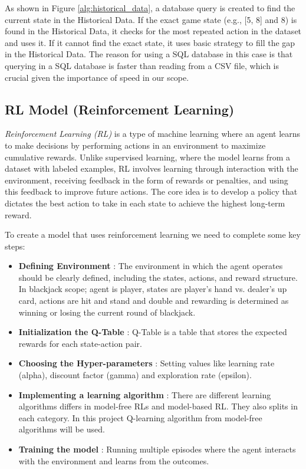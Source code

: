 \documentclass[a4paper,12pt]{report}
\begin{document}
As shown in Figure \ref{alg:historical_data}, a database query is created to find the current state in the Historical Data. If the exact game state (e.g., [5, 8] and 8) is found in the Historical Data, it checks for the most repeated action in the dataset and uses it. If it cannot find the exact state, it uses basic strategy to fill the gap in the Historical Data. The reason for using a SQL database in this case is that querying in a SQL database is faster than reading from a CSV file, which is crucial given the importance of speed in our scope.

\subsection{RL Model (Reinforcement Learning)}
\label{RL}
\textit{Reinforcement Learning (RL)} is a type of machine learning where an agent learns to make decisions by performing actions in an environment to maximize cumulative rewards. Unlike supervised learning, where the model learns from a dataset with labeled examples, RL involves learning through interaction with the environment, receiving feedback in the form of rewards or penalties, and using this feedback to improve future actions. The core idea is to develop a policy that dictates the best action to take in each state to achieve the highest long-term reward.

To create a model that uses reinforcement learning we need to complete some key steps:
\begin{itemize}
    \item \textbf{Defining Environment} : The environment in which the agent operates should be clearly defined, including the states, actions, and reward structure. In blackjack scope; agent is player, states are player's hand vs. dealer's up card, actions are hit and stand and double and rewarding is determined as winning or losing the current round of blackjack.
    \item \textbf{Initialization the Q-Table} : Q-Table is a table that stores the expected rewards for each state-action pair.
    \item \textbf{Choosing the Hyper-parameters} : Setting values like learning rate (alpha), discount factor (gamma) and exploration rate (epsilon).
    \item \textbf{Implementing a learning algorithm} : There are different learning algorithms differs in model-free RLs and model-based RL. They also splits in each category. In this project Q-learning algorithm from model-free algorithms will be used.
    \item \textbf{Training the model} : Running multiple episodes where the agent interacts with the environment and learns from the outcomes.
\end{itemize}
\end{document}
